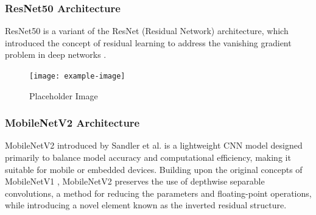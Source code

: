 \subsubsection{ResNet50 Architecture}
\label{sec:resnet}
ResNet50 is a variant of the ResNet (Residual Network) architecture, which introduced the concept of residual learning to address the vanishing gradient problem in deep networks \cite{he2016}. 

\begin{figure}[ht]
    \centering
    \texttt{[image: example-image]} 
    \caption{Placeholder Image }
    \label{fig:placeholder1}
\end{figure}


\subsubsection{MobileNetV2 Architecture}
\label{sec:mobilenet}
MobileNetV2 introduced by Sandler et al. \cite{sandler2018mobilenetv2} is a lightweight CNN model designed primarily to balance model accuracy and computational efficiency, making it suitable for mobile or embedded devices. Building upon the original concepts of MobileNetV1 \cite{howard2017mobilenetsefficientconvolutionalneural}, MobileNetV2 preserves the use of depthwise separable convolutions, a method for reducing the parameters and floating-point operations, while introducing a novel element known as the inverted residual structure. 



